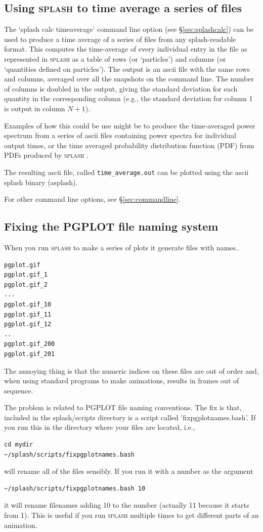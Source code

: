 \documentclass[a4paper,10pt]{article}
\newcommand{\splash}{\textsc{splash }}
\begin{document}
\subsection{Using \splash to time average a series of files}
 The `splash calc timeaverage' command line option (see \S\ref{sec:splashcalc}) can be used to produce a time average of a series of files from any splash-readable format. This computes the time-average of every individual entry in the file as represented in \splash as a table of rows (or `particles') and columns (or `quantities defined on particles'). The output is an ascii file with the same rows and columns, averaged over all the snapshots on the command line. The number of columns is doubled in the output, giving the standard deviation for each quantity in the corresponding column (e.g., the standard deviation for column 1 is output in column $N + 1$).
 
 Examples of how this could be use might be to produce the time-averaged power spectrum from a series of ascii files containing power spectra for individual output times, or the time averaged probability distribution function (PDF) from PDFs produced by \splash.
 
 The resulting ascii file, called \verb+time_average.out+ can be plotted using the ascii splash binary (asplash).

 For other command line options, see \S\ref{sec:commandline}.

\subsection{Fixing the PGPLOT file naming system} 
\label{sec:fixpgplotnames}

When you run \splash to make a series of plots it generate files with names..
\begin{verbatim}
pgplot.gif
pgplot.gif_1
pgplot.gif_2
...
pgplot.gif_10
pgplot.gif_11
pgplot.gif_12
..
pgplot.gif_200
pgplot.gif_201
\end{verbatim}
The annoying thing is that the numeric indices on these files are out of order and, when using
standard programs to make animations, results in frames out of sequence.

 The problem is related to PGPLOT file naming conventions. The fix is that, included in the splash/scripts directory is a script called 'fixpgplotnames.bash'. If you run this in the directory where your files are located, i.e.,
\begin{verbatim}
cd mydir
~/splash/scripts/fixpgplotnames.bash
\end{verbatim}
will rename all of the files sensibly. If you run it with a number as the argument
\begin{verbatim}
~/splash/scripts/fixpgplotnames.bash 10
\end{verbatim}
it will rename filenames adding 10 to the number (actually 11 because it starts from 1). This is
useful if you run \splash multiple times to get different parts of an animation. 
\end{document}
